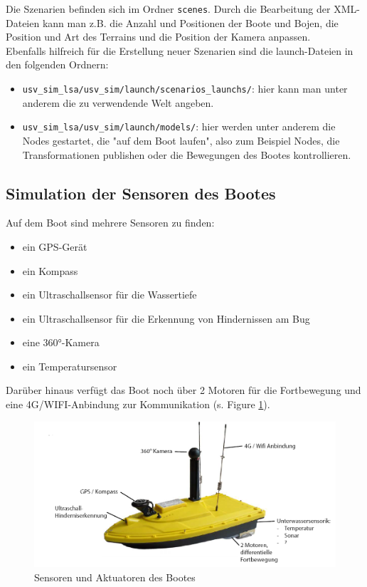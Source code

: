 \documentclass[11pt]{article}
\begin{document}
Die Szenarien befinden sich im Ordner \texttt{scenes}. Durch die Bearbeitung der XML-Dateien kann man z.B. die Anzahl und Positionen der Boote und Bojen, die Position und Art des Terrains und die Position der Kamera anpassen.\\
Ebenfalls hilfreich für die Erstellung neuer Szenarien sind die launch-Dateien in den folgenden Ordnern:

\begin{itemize}
	\item \texttt{usv\_sim\_lsa/usv\_sim/launch/scenarios\_launchs/}: hier kann man unter anderem die zu verwendende Welt angeben.
	\item \texttt{usv\_sim\_lsa/usv\_sim/launch/models/}: hier werden unter anderem die Nodes gestartet, die "auf dem Boot laufen", also zum Beispiel Nodes, die Transformationen publishen oder die Bewegungen des Bootes kontrollieren.
\end{itemize}

\subsection{Simulation der Sensoren des Bootes}

Auf dem Boot sind mehrere Sensoren zu finden:

\begin{itemize}
	\item ein GPS-Gerät
	\item ein Kompass
	\item ein Ultraschallsensor für die Wassertiefe
	\item ein Ultraschallsensor für die Erkennung von Hindernissen am Bug
	\item eine 360°-Kamera
	\item ein Temperatursensor
\end{itemize}

Darüber hinaus verfügt das Boot noch über 2 Motoren für die Fortbewegung und eine 4G/WIFI-Anbindung zur Kommunikation (s. Figure \ref{boot}).\\

\begin{figure}
	\includegraphics[width=\linewidth]{boot.png}
	\caption{Sensoren und Aktuatoren des Bootes}
	\label{boot}
\end{figure}
\end{document}

